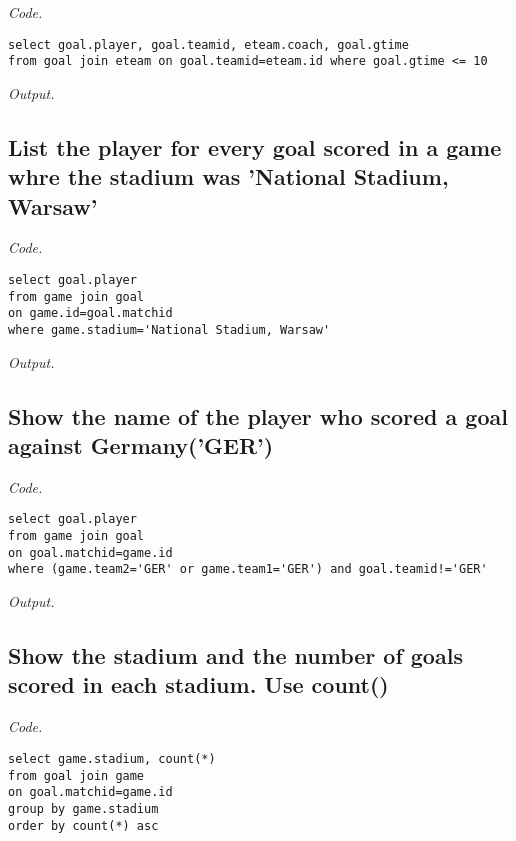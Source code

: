\documentclass[12pt]{article}
\begin{document}
\textit{Code.}

\begin{lstlisting}
select goal.player, goal.teamid, eteam.coach, goal.gtime
from goal join eteam on goal.teamid=eteam.id where goal.gtime <= 10
\end{lstlisting}

\textit{Output.}\\

\subsection{List the player for every goal scored in a game whre the stadium was 'National Stadium, Warsaw'}

\textit{Code.}

\begin{lstlisting}
select goal.player
from game join goal
on game.id=goal.matchid
where game.stadium='National Stadium, Warsaw'
\end{lstlisting}

\textit{Output.}\\

\subsection{Show the name of the player who scored a goal against Germany('GER')}

\textit{Code.}

\begin{lstlisting}
select goal.player
from game join goal
on goal.matchid=game.id
where (game.team2='GER' or game.team1='GER') and goal.teamid!='GER'
\end{lstlisting}

\textit{Output.}\\

\subsection{Show the stadium and the number of goals scored in each stadium. Use count()}

\textit{Code.}

\begin{lstlisting}
select game.stadium, count(*)
from goal join game
on goal.matchid=game.id
group by game.stadium
order by count(*) asc
\end{lstlisting}
\end{document}
